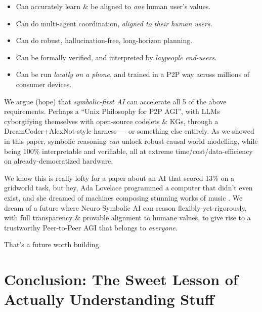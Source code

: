 \documentclass[11pt]{article}
\begin{document}
\begin{itemize}
    \item Can accurately learn \& be aligned to \textit{one} human user's values.
    \item Can do multi-agent coordination, \textit{aligned to their human users}.
    \item Can do robust, hallucination-free, long-horizon planning.
    \item Can be formally verified, and interpreted by \textit{laypeople end-users}.
    \item Can be run \textit{locally on a phone}, and trained in a P2P way across millions of consumer devices.
\end{itemize}

We argue (hope) that \textit{symbolic-first AI} can accelerate all 5 of the above requirements. Perhaps a ``Unix Philosophy for P2P AGI'', with LLMs cyborgifying themselves with open-source codelets \& KGs, through a DreamCoder+AlexNot-style harness — or something else entirely. As we showed in this paper, symbolic reasoning \textit{can} unlock robust causal world modelling, while being 100\% interpretable and verifiable, all at extreme time/cost/data-efficiency on already-democratized hardware.

We know this is really lofty for a paper about an AI that scored 13\% on a gridworld task, but hey, Ada Lovelace programmed a computer that didn't even exist, and she dreamed of machines composing stunning works of music \citep{lovelace_notes}. We dream of a future where Neuro-Symbolic AI can reason flexibly-yet-rigorously, with full transparency \& provable alignment to humane values, to give rise to a trustworthy Peer-to-Peer AGI that belongs to \textit{everyone}.

That's a future worth building.












\section{Conclusion: The Sweet Lesson of Actually Understanding Stuff}\label{sec:conclusion}
\end{document}

